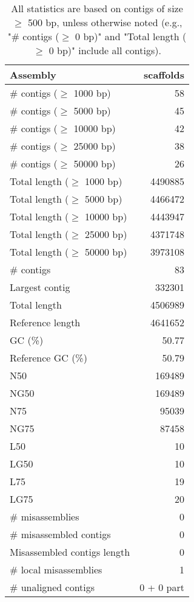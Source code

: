 \documentclass[12pt,a4paper]{article}
\begin{document}
\begin{table}[ht]
\begin{center}
\caption{All statistics are based on contigs of size $\geq$ 500 bp, unless otherwise noted (e.g., "\# contigs ($\geq$ 0 bp)" and "Total length ($\geq$ 0 bp)" include all contigs).}
\begin{tabular}{|l*{1}{|r}|}
\hline
Assembly & scaffolds \\ \hline
\# contigs ($\geq$ 1000 bp) & 58 \\ \hline
\# contigs ($\geq$ 5000 bp) & 45 \\ \hline
\# contigs ($\geq$ 10000 bp) & 42 \\ \hline
\# contigs ($\geq$ 25000 bp) & 38 \\ \hline
\# contigs ($\geq$ 50000 bp) & 26 \\ \hline
Total length ($\geq$ 1000 bp) & 4490885 \\ \hline
Total length ($\geq$ 5000 bp) & 4466472 \\ \hline
Total length ($\geq$ 10000 bp) & 4443947 \\ \hline
Total length ($\geq$ 25000 bp) & 4371748 \\ \hline
Total length ($\geq$ 50000 bp) & 3973108 \\ \hline
\# contigs & 83 \\ \hline
Largest contig & 332301 \\ \hline
Total length & 4506989 \\ \hline
Reference length & 4641652 \\ \hline
GC (\%) & 50.77 \\ \hline
Reference GC (\%) & 50.79 \\ \hline
N50 & 169489 \\ \hline
NG50 & 169489 \\ \hline
N75 & 95039 \\ \hline
NG75 & 87458 \\ \hline
L50 & 10 \\ \hline
LG50 & 10 \\ \hline
L75 & 19 \\ \hline
LG75 & 20 \\ \hline
\# misassemblies & 0 \\ \hline
\# misassembled contigs & 0 \\ \hline
Misassembled contigs length & 0 \\ \hline
\# local misassemblies & 1 \\ \hline
\# unaligned contigs & 0 + 0 part \\ \hline

\end{tabular}
\end{center}
\end{table}
\end{document}
